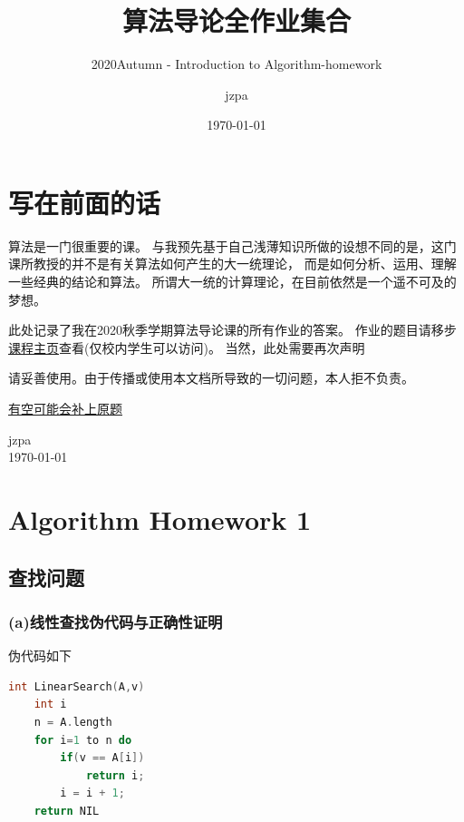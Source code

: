 \documentclass[cn,11pt,chinese]{elegantbook}
\title{算法导论全作业集合}
\subtitle{2020Autumn - Introduction to Algorithm-homework}
\author{jzpa}
\institute{USTC}
\date{\today }
\begin{document}
\maketitle
\frontmatter

\chapter*{写在前面的话}

算法是一门很重要的课。
与我预先基于自己浅薄知识所做的设想不同的是，这门课所教授的并不是有关算法如何产生的大一统理论，
而是如何分析、运用、理解一些经典的结论和算法。
所谓大一统的计算理论，在目前依然是一个遥不可及的梦想。

此处记录了我在2020秋季学期算法导论课的所有作业的答案。
作业的题目请移步\href{http://202.38.86.171/}{课程主页}查看(仅校内学生可以访问)。
当然，此处需要再次声明

\begin{center}
  请妥善使用。由于传播或使用本文档所导致的一切问题，本人拒不负责。
\end{center}

\underline{有空可能会补上原题}

\vskip 1.5cm

\begin{flushright}
jzpa\\
\today 
\end{flushright}

\tableofcontents

\mainmatter



\chapter{Algorithm Homework 1}

\section{查找问题}

\subsection{(a)线性查找伪代码与正确性证明}

伪代码如下
\begin{lstlisting}[language = C++]
int LinearSearch(A,v)
    int i
    n = A.length
    for i=1 to n do
        if(v == A[i])
            return i;
        i = i + 1;
    return NIL
\end{lstlisting}
\end{document}
